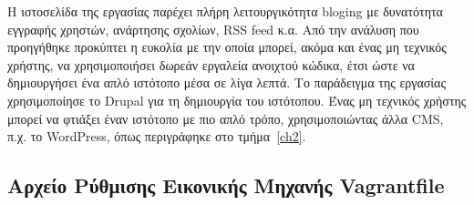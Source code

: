 \documentclass[12pt]{report}
\begin{document}
Η ιστοσελίδα της εργασίας παρέχει πλήρη λειτουργικότητα \textlatin{bloging} με δυνατότητα εγγραφής χρηστών, ανάρτησης σχολίων, \textlatin{RSS feed} κ.α. Από την ανάλυση που προηγήθηκε προκύπτει η ευκολία με την οποία μπορεί, ακόμα και ένας μη τεχνικός χρήστης, να χρησιμοποιήσει δωρεάν εργαλεία ανοιχτού κώδικα, έτσι ώστε να δημιουργήσει ένα απλό ιστότοπο μέσα σε λίγα λεπτά. Το παράδειγμα της εργασίας χρησιμοποίησε το \textlatin{Drupal} για τη δημιουργία του ιστότοπου. Ένας μη τεχνικός χρήστης μπορεί να φτιάξει έναν ιστότοπο με πιο απλό τρόπο, χρησιμοποιώντας άλλα \textlatin{CMS}, π.χ. το \textlatin{WordPress}, όπως περιγράφηκε στο τμήμα~\ref{ch2}.

\begin{appendices}
\chapter{Αρχείο Ρύθμισης Εικονικής Μηχανής \textlatin{Vagrantfile}}\label{AppA}
\inputminted[linenos, fontsize=\scriptsize, breaklines, baselinestretch=1]{ruby}{sources/Vagrantfile}
\end{appendices}

\appendix



\end{document}

